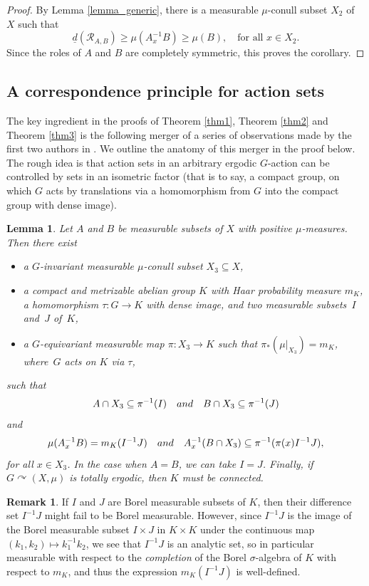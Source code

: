 \documentclass[11pt]{article}
\numberwithin{equation}{section}
\let\mathcal\mathscr
\newcommand{\cR}{\mathcal{R}}
\newcommand{\qand}{\quad\textup{and}\quad}
\let\acts\curvearrowright
\theoremstyle{plain}
\newtheorem{lemma}[theorem]{Lemma}
\theoremstyle{definition}
\newtheorem{remark}[theorem]{Remark}
\begin{document}
\begin{proof}
By Lemma \ref{lemma_generic}, there is a measurable $\mu$-conull subset $X_2$ of $X$ such that
\[
\underline{d}(\cR_{A,B}) \geq \mu(A_x^{-1}B) \geq \mu(B), \quad \textrm{for all $x \in X_2$}.
\]
Since the roles of $A$ and $B$ are completely symmetric, this proves the corollary.
\end{proof}

\subsection{A correspondence principle for action sets}

The key ingredient in the proofs of Theorem \ref{thm1}, Theorem \ref{thm2} and Theorem \ref{thm3} is the following merger of a series of
observations made by the first two authors in \cite{BF}. We outline the anatomy of this merger in the proof below. The rough idea is that
action sets in an arbitrary ergodic $G$-action can be controlled by sets in an isometric factor (that is to say, a compact group, on which $G$
acts by translations via a homomorphism from $G$ into the compact group with dense image).

\begin{lemma}
\label{corrprinciple}
Let $A$ and $B$ be measurable subsets of $X$ with positive $\mu$-measures. Then there exist

\begin{itemize}
\item a $G$-invariant measurable $\mu$-conull subset $X_3 \subseteq X$,
\item a compact and metrizable abelian group $K$ with Haar probability measure $m_K$, a homomorphism $\tau : G \to K$ with dense image,
and two measurable subsets~$I$ and~$J$ of~$K$,
\item a $G$-equivariant measurable map $\pi : X_3 \to K$ such that $\pi_*(\mu |_{X_3}) = m_K$, where~$G$ acts on $K$ via $\tau$,
\end{itemize}
such that
\[
A \cap X_3 \subseteq \pi^{-1}(I) \qand B \cap X_3 \subseteq \pi^{-1}(J)
\]
and
\[
\mu(A_x^{-1}B) = m_K(I^{-1}J)
\qand
A_x^{-1}(B \cap X_3) \subseteq \pi^{-1}(\pi(x) I^{-1}J),
\]
for all $x \in X_3$. In the case when $A = B$, we can take $I = J$. Finally, if $G \acts (X,\mu)$ is totally ergodic, then $K$ must be connected.
\end{lemma}

\begin{remark}
If $I$ and $J$ are Borel measurable subsets of $K$, then their difference set $I^{-1}J$ might fail to be Borel measurable. However, since
$I^{-1}J$ is the image of the Borel measurable subset $I \times J$ in $K \times K$ under the continuous map $(k_1,k_2) \mapsto k_1^{-1}k_2$,
we see that $I^{-1}J$ is an analytic set, so in particular measurable with respect to the \emph{completion} of the Borel $\sigma$-algebra of $K$ with
respect to $m_K$, and thus the expression $m_K(I^{-1}J)$ is well-defined.
\end{remark}
\end{document}
